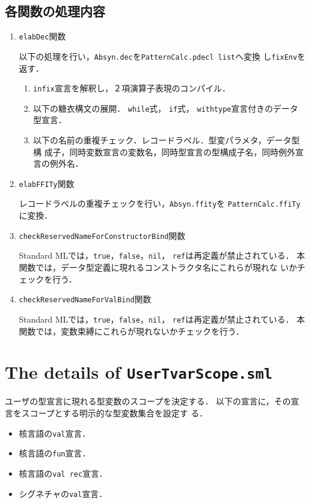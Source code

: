 \documentclass{jbook}
\newif\ifjp
\newcommand{\txt}[2]{#2}
\newcommand{\code}[1]{\mbox{\large\tt #1}}
\begin{document}
\subsection{各関数の処理内容}
\begin{enumerate}
\item \code{elabDec}関数

以下の処理を行い，\code{Absyn.dec}を\code{PatternCalc.pdecl list}へ変換
し\code{fixEnv}を返す．
\begin{enumerate}
\item \code{infix}宣言を解釈し，２項演算子表現のコンパイル．
\item 以下の糖衣構文の展開．
\code{while}式，
\code{if}式，
\code{withtype}宣言付きのデータ型宣言．
\item 以下の名前の重複チェック．レコードラベル．型変パラメタ，データ型構
成子，同時変数宣言の変数名，同時型宣言の型構成子名，同時例外宣言の例外名．
\end{enumerate}
	
\item \code{elabFFITy}関数

レコードラベルの重複チェックを行い，\code{Absyn.ffity}を
\code{PatternCalc.ffiTy}に変換．

\item \code{checkReservedNameForConstructorBind}関数

	Standard MLでは，\code{true}，\code{false}，\code{nil}，
\code{ref}は再定義が禁止されている．
	本関数では，データ型定義に現れるコンストラクタ名にこれらが現れな
いかチェックを行う．
\item \code{checkReservedNameForValBind}関数

	Standard MLでは，\code{true}，\code{false}，\code{nil}，
\code{ref}は再定義が禁止されている．
	本関数では，変数束縛にこれらが現れないかチェックを行う．
\end{enumerate}

\else%
\fi%

\section{\txt{\code{UserTvarScope.sml}の処理の詳細}{The details of \code{UserTvarScope.sml}}}
\ifjp%
	ユーザの型宣言に現れる型変数のスコープを決定する．
	以下の宣言に，その宣言をスコープとする明示的な型変数集合を設定す
る．
\begin{itemize}
\item 核言語の\code{val}宣言．
\item 核言語の\code{fun}宣言．
\item 核言語の\code{val rec}宣言．
\item シグネチャの\code{val}宣言．
\end{itemize}
\end{document}
